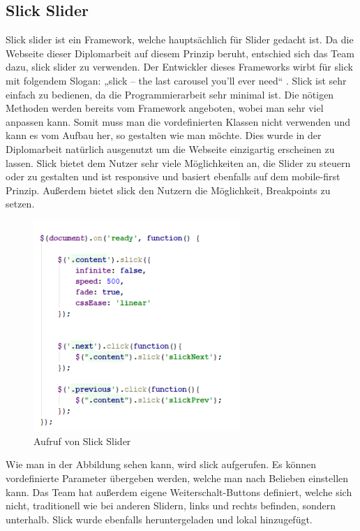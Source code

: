 \subsection{Slick Slider}
Slick slider ist ein Framework, welche hauptsächlich für Slider gedacht ist. Da die Webseite dieser Diplomarbeit auf diesem Prinzip beruht, entschied sich das Team dazu, slick slider zu verwenden. Der Entwickler dieses Frameworks wirbt für slick mit folgendem Slogan: „slick – the last carousel you’ll ever need“ . Slick ist sehr einfach zu bedienen, da die Programmierarbeit sehr minimal ist. Die nötigen Methoden werden bereits vom Framework angeboten, wobei man sehr viel anpassen kann. Somit muss man die vordefinierten Klassen nicht verwenden und kann es vom Aufbau her, so gestalten wie man möchte. Dies wurde in der Diplomarbeit natürlich ausgenutzt um die Webseite einzigartig erscheinen zu lassen. Slick bietet dem Nutzer sehr viele Möglichkeiten an, die Slider zu steuern oder zu gestalten und ist responsive und basiert ebenfalls auf dem mobile-first Prinzip. Außerdem bietet slick den Nutzern die Möglichkeit, Breakpoints zu setzen.
\begin{figure}[H] 
  \centering
     \includegraphics[width=0.7\textwidth]{webseite_abb1.png}
  \caption{Aufruf von Slick Slider}

\end{figure}

Wie man in der Abbildung sehen kann, wird slick aufgerufen. Es können vordefinierte Parameter übergeben werden, welche man nach Belieben einstellen kann. Das Team hat außerdem eigene Weiterschalt-Buttons definiert, welche sich nicht, traditionell wie bei anderen Slidern, links und rechts befinden, sondern unterhalb. Slick wurde ebenfalls heruntergeladen und lokal hinzugefügt. 

